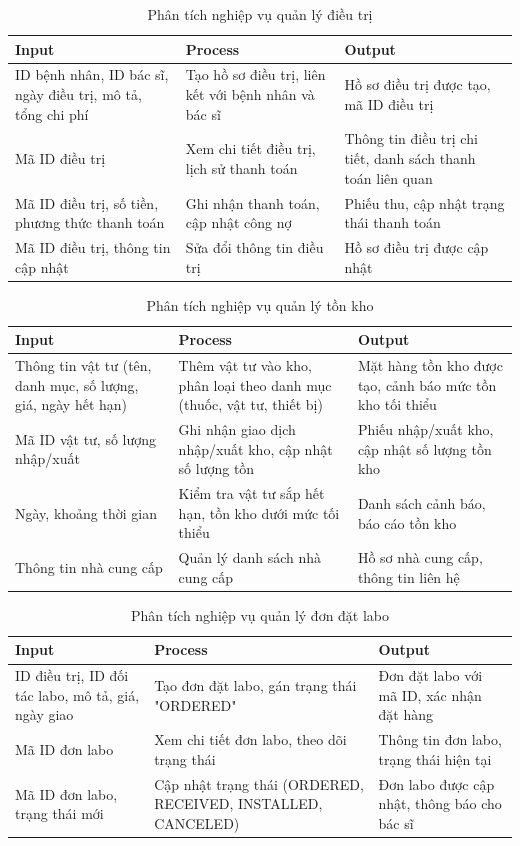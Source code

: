 \begin{table}[h]
\centering
\caption{Phân tích nghiệp vụ quản lý điều trị}
\begin{tabular}{|p{4cm}|p{5cm}|p{4.5cm}|}
\hline
\textbf{Input} & \textbf{Process} & \textbf{Output} \\
\hline
ID bệnh nhân, ID bác sĩ, ngày điều trị, mô tả, tổng chi phí & Tạo hồ sơ điều trị, liên kết với bệnh nhân và bác sĩ & Hồ sơ điều trị được tạo, mã ID điều trị \\
\hline
Mã ID điều trị & Xem chi tiết điều trị, lịch sử thanh toán & Thông tin điều trị chi tiết, danh sách thanh toán liên quan \\
\hline
Mã ID điều trị, số tiền, phương thức thanh toán & Ghi nhận thanh toán, cập nhật công nợ & Phiếu thu, cập nhật trạng thái thanh toán \\
\hline
Mã ID điều trị, thông tin cập nhật & Sửa đổi thông tin điều trị & Hồ sơ điều trị được cập nhật \\
\hline
\end{tabular}
\end{table}

\begin{table}[h]
\centering
\caption{Phân tích nghiệp vụ quản lý tồn kho}
\begin{tabular}{|p{4cm}|p{5cm}|p{4.5cm}|}
\hline
\textbf{Input} & \textbf{Process} & \textbf{Output} \\
\hline
Thông tin vật tư (tên, danh mục, số lượng, giá, ngày hết hạn) & Thêm vật tư vào kho, phân loại theo danh mục (thuốc, vật tư, thiết bị) & Mặt hàng tồn kho được tạo, cảnh báo mức tồn kho tối thiểu \\
\hline
Mã ID vật tư, số lượng nhập/xuất & Ghi nhận giao dịch nhập/xuất kho, cập nhật số lượng tồn & Phiếu nhập/xuất kho, cập nhật số lượng tồn kho \\
\hline
Ngày, khoảng thời gian & Kiểm tra vật tư sắp hết hạn, tồn kho dưới mức tối thiểu & Danh sách cảnh báo, báo cáo tồn kho \\
\hline
Thông tin nhà cung cấp & Quản lý danh sách nhà cung cấp & Hồ sơ nhà cung cấp, thông tin liên hệ \\
\hline
\end{tabular}
\end{table}

\begin{table}[h]
\centering
\caption{Phân tích nghiệp vụ quản lý đơn đặt labo}
\begin{tabular}{|p{4cm}|p{5cm}|p{4.5cm}|}
\hline
\textbf{Input} & \textbf{Process} & \textbf{Output} \\
\hline
ID điều trị, ID đối tác labo, mô tả, giá, ngày giao & Tạo đơn đặt labo, gán trạng thái "ORDERED" & Đơn đặt labo với mã ID, xác nhận đặt hàng \\
\hline
Mã ID đơn labo & Xem chi tiết đơn labo, theo dõi trạng thái & Thông tin đơn labo, trạng thái hiện tại \\
\hline
Mã ID đơn labo, trạng thái mới & Cập nhật trạng thái (ORDERED, RECEIVED, INSTALLED, CANCELED) & Đơn labo được cập nhật, thông báo cho bác sĩ \\
\hline
\end{tabular}
\end{table}


